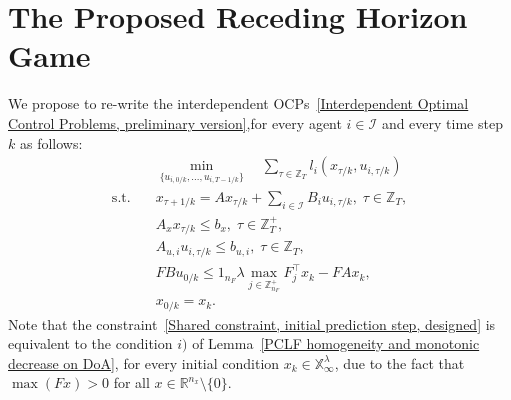\documentclass[letterpaper, 10 pt, conference]{ieeeconf}  %
\newcommand{\R}{\mathbb{R}}
\newcommand{\Z}{\mathbb{Z}}
\newcommand{\X}{\mathbb{X}}
\newcommand{\mc}[1]{\mathcal{#1}}
\begin{document}
\section{The Proposed Receding Horizon Game}
We propose to re-write the interdependent OCPs~\eqref{Interdependent Optimal Control Problems, preliminary version},for every agent $i \in \mc{I}$ and every time step $k$ as follows:
\begin{subequations}\label{Interdependent Optimal Control Problems, designed}
\begin{align}
& \min_{\{u_{i,0/k},...,u_{i,T-1/k}\}}  \quad \sum_{\tau \in \Z_{T}}l_{i}(x_{\tau/k}, u_{i,\tau/k})\\
\text{s.t.} \quad & x_{\tau+1/k} = A x_{\tau/k} + \sum_{i \in \mc{I}}B_{i}u_{i,\tau/k},\; \tau \in \Z_{T}, \label{DT-LTI, IOCP, designed}\\
& A_{x} x_{\tau/k} \leq b_{x},\; \tau \in \Z^{+}_{T},\\
& A_{u,i} u_{i,\tau/k} \leq b_{u,i},\; \tau \in \Z_{T},\\
& F B u_{0/k} \leq 1_{n_{F}} \lambda \max_{j \in \Z^{+}_{n_{F}}} F^{\top}_{j}x_{k} - F A x_{k}, \label{Shared constraint, initial prediction step, designed}\\
& x_{0/k} = x_{k}.
\end{align}
\end{subequations}
Note that the constraint~\eqref{Shared constraint, initial prediction step, designed} is equivalent to the condition $i)$ of Lemma~\ref{PCLF homogeneity and monotonic decrease on DoA}, for every initial condition $x_{k} \in \X^{\lambda}_{\infty}$, due to the fact that $\max(Fx) > 0$ for all $x \in \R^{n_x} \setminus \{0\}$.
\end{document}
